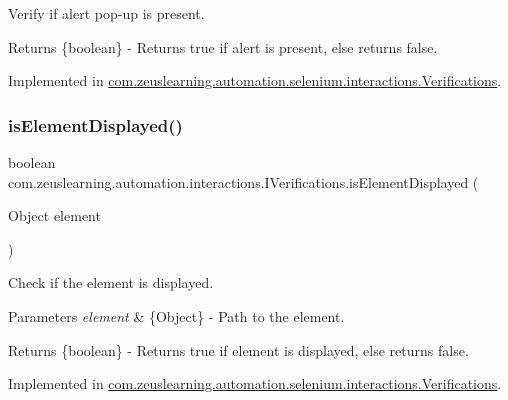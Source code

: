 Verify if alert pop-\/up is present.

\begin{DoxyReturn}{Returns}
\{boolean\} -\/ Returns {\ttfamily true} if alert is present, else returns {\ttfamily false}. 
\end{DoxyReturn}


Implemented in \hyperlink{classcom_1_1zeuslearning_1_1automation_1_1selenium_1_1interactions_1_1Verifications_a1719b6ad2358f7e080119d4cfa911ad8}{com.\+zeuslearning.\+automation.\+selenium.\+interactions.\+Verifications}.

\hypertarget{interfacecom_1_1zeuslearning_1_1automation_1_1interactions_1_1IVerifications_a058cc25b997507a15fe6e76ba401d54d}{}\label{interfacecom_1_1zeuslearning_1_1automation_1_1interactions_1_1IVerifications_a058cc25b997507a15fe6e76ba401d54d} 
\subsubsection{\texorpdfstring{is\+Element\+Displayed()}{isElementDisplayed()}\hspace{0.1cm}{\footnotesize\ttfamily [1/2]}}
{\footnotesize\ttfamily boolean com.\+zeuslearning.\+automation.\+interactions.\+I\+Verifications.\+is\+Element\+Displayed (\begin{DoxyParamCaption}\item[{Object}]{element }\end{DoxyParamCaption})}

Check if the element is displayed.


\begin{DoxyParams}{Parameters}
{\em element} & \{Object\} -\/ Path to the element. \\
\hline
\end{DoxyParams}
\begin{DoxyReturn}{Returns}
\{boolean\} -\/ Returns {\ttfamily true} if element is displayed, else returns {\ttfamily false}. 
\end{DoxyReturn}


Implemented in \hyperlink{classcom_1_1zeuslearning_1_1automation_1_1selenium_1_1interactions_1_1Verifications_a848b9875c187f2c7f5bbf6b78f7db58f}{com.\+zeuslearning.\+automation.\+selenium.\+interactions.\+Verifications}.

